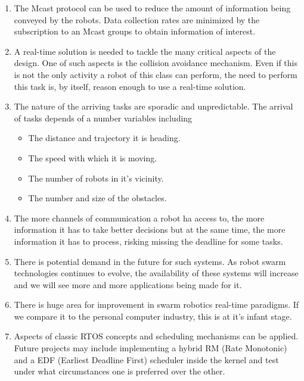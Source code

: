 \documentclass[journal]{IEEEtran}
\begin{document}
\begin{enumerate}
\item The Mcast protocol can be used to reduce the amount of information being conveyed by the robots. Data collection rates are minimized by the subscription to an Mcast groups to obtain information of interest.

\item A real-time solution is needed to tackle the many critical aspects of the design. One of such aspects is the collision avoidance mechanism. Even if this is not the only activity a robot of this class can perform, the need to perform this task is, by itself, reason enough to use a real-time solution.

\item The nature of the arriving tasks are sporadic and unpredictable. The arrival of tasks depends of a number variables including

\begin{itemize}
\item The distance and trajectory it is heading.
\item The speed with which it is moving.
\item The number of robots in it's vicinity.
\item The number and size of the obstacles.
\end{itemize}

\item The more channels of communication a robot ha access to, the more information it has to take better decisions but at the same time, the more information it has to process, risking missing the deadline for some tasks.

\item There is potential demand in the future for such systems. As robot swarm technologies continues to evolve, the availability of these systems will increase and we will see more and more applications being made for it.

\item There is huge area for improvement in swarm robotics real-time paradigms. If we compare it to the personal computer industry, this is at it's infant stage.

\item Aspects of classic RTOS concepts and scheduling mechanisms can be applied. Future projects may include implementing a hybrid RM (Rate Monotonic) and a EDF (Earliest Deadline First) scheduler inside the kernel and test under what circumstances one is preferred over the other.

\end{enumerate}
\end{document}

